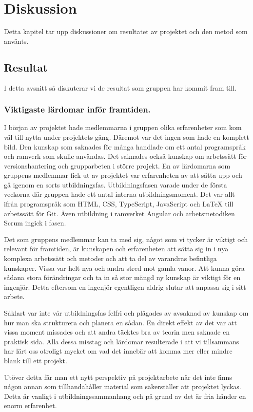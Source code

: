 \chapter{Diskussion}
Detta kapitel tar upp diskussioner om resultatet av projektet och den metod som använts.
\section{Resultat}
I detta avsnitt så diskuterar vi de resultat som gruppen har kommit fram till.

\subsection{Viktigaste lärdomar inför framtiden.}
I början av projektet hade medlemmarna i gruppen olika erfarenheter som kom väl till nytta under projektets gång. Däremot var det ingen som hade en komplett bild. Den kunskap som saknades för många handlade om ett antal programspråk och ramverk som skulle användas. Det saknades också kunskap om arbetssätt för versionshantering och grupparbeten i större projekt. En av lärdomarna som gruppens medlemmar fick ut av projektet var erfarenheten av att sätta upp och gå igenom en sorts utbildningsfas. Utbildningsfasen varade under de första veckorna där gruppen hade ett antal interna utbildningsmoment. Det var allt ifrån programspråk som HTML, CSS, TypeScript, JavaScript och LaTeX till arbetssätt för Git. Även utbildning i ramverket Angular och arbetsmetodiken Scrum ingick i fasen.

Det som gruppens medlemmar kan ta med sig, något som vi tycker är viktigt och relevant för framtiden, är kunskapen och erfarenheten att sätta sig in i nya komplexa arbetssätt och metoder och att ta del av varandras befintliga kunskaper. Vissa var helt nya och andra stred mot gamla vanor. Att kunna göra sådana stora förändringar och ta in så stor mängd ny kunskap är viktigt för en ingenjör. Detta eftersom en ingenjör egentligen aldrig slutar att anpassa sig i sitt arbete.

Såklart var inte vår utbildningsfas felfri och plågades av avsaknad av kunskap om hur man ska strukturera och planera en sådan. En direkt effekt av det var att vissa moment missades och att andra täcktes bra av teorin men saknade en praktisk sida. Alla dessa misstag och lärdomar resulterade i att vi tillsammans har lärt oss otroligt mycket om vad det innebär att komma mer eller mindre blank till ett projekt.

Utöver detta får man ett nytt perspektiv på projektarbete när det inte finns någon annan som tillhandahåller material som säkerställer att projektet lyckas. Detta är vanligt i utbildningssammanhang och på grund av det är fria händer en enorm erfarenhet.
